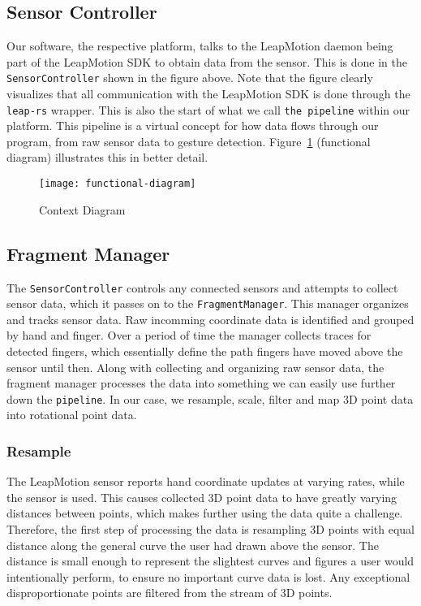 \documentclass{standalone}
\begin{document}
  \subsection{Sensor Controller}
  Our software, the respective platform, talks to the LeapMotion daemon being
  part of the LeapMotion SDK to obtain data from the sensor. This is done in the
  \verb_SensorController_ shown in the figure above. Note that the figure
  clearly visualizes that all communication with the LeapMotion SDK is done
  through the \verb_leap-rs_ wrapper. This is also the start of what we call
  \verb_the pipeline_ within our platform. This pipeline is a virtual concept
  for how data flows through our program, from raw sensor data to gesture
  detection.
  Figure~\ref{fig:pipeline-diagram} (functional diagram) illustrates this in better
  detail.

  \begin{figure}[h]
    \centering
      \texttt{[image: functional-diagram]}
    \caption{Context Diagram}
    \label{fig:pipeline-diagram}
  \end{figure}

  \subsection{Fragment Manager}
  The \verb_SensorController_ controls any connected sensors and attempts to
  collect sensor data, which it passes on to the \verb_FragmentManager_. This
  manager organizes and tracks sensor data. Raw incomming coordinate data is
  identified and grouped by hand and finger. Over a period of time the manager
  collects traces for detected fingers, which essentially define the path
  fingers have moved above the sensor until then. Along with collecting and
  organizing raw sensor data, the fragment manager processes the data into
  something we can easily use further down the \verb_pipeline_. In our case, we
  resample, scale, filter and map 3D point data into rotational point data.

  \subsubsection{Resample}
  The LeapMotion sensor reports hand coordinate updates at varying rates, while
  the sensor is used. This causes collected 3D point data to have greatly
  varying distances between points, which makes further using the data quite a
  challenge. Therefore, the first step of processing the data is resampling 3D
  points with equal distance along the general curve the user had drawn above
  the sensor. The distance is small enough to represent the slightest curves and
  figures a user would intentionally perform, to ensure no important curve data
  is lost. Any exceptional disproportionate points are filtered from the stream
  of 3D points.
\end{document}
